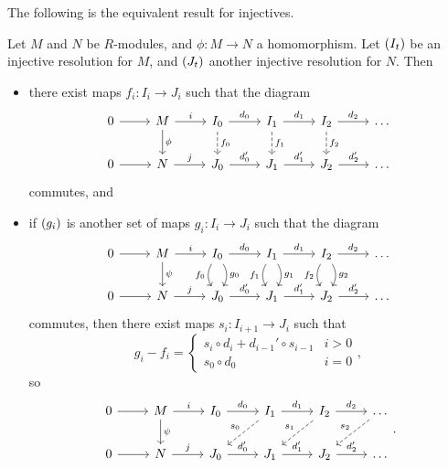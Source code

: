 The following is the equivalent result for injectives.

\begin{proposition}
Let $ M $ and $ N $ be $ R $-modules, and $ \phi : M \to N $ a homomorphism. Let $ \br{I_t} $ be an injective resolution for $ M $, and $ \br{J_t} $ another injective resolution for $ N $. Then
\begin{itemize}
\item there exist maps $ f_i : I_i \to J_i $ such that the diagram
$$
\begin{tikzcd}
0 \arrow{r} & M \arrow{r}{i} \arrow{d}{\phi} & I_0 \arrow{r}{d_0} \arrow[dashed]{d}{f_0} & I_1 \arrow{r}{d_1} \arrow[dashed]{d}{f_1} & I_2 \arrow{r}{d_2} \arrow[dashed]{d}{f_2} & \dots \\
0 \arrow{r} & N \arrow{r}{j} & J_0 \arrow{r}{d_0'} & J_1 \arrow{r}{d_1'} & J_2 \arrow{r}{d_2'} & \dots
\end{tikzcd}
$$
commutes, and
\item if $ \br{g_i} $ is another set of maps $ g_i : I_i \to J_i $ such that the diagram
$$
\begin{tikzcd}
0 \arrow{r} & M \arrow{r}{i} \arrow{d}{\psi} & I_0 \arrow{r}{d_0} \arrow[bend right=30, swap]{d}{f_0} \arrow[bend left=30]{d}{g_0} & I_1 \arrow{r}{d_1} \arrow[bend right=30, swap]{d}{f_1} \arrow[bend left=30]{d}{g_1} & I_2 \arrow{r}{d_2} \arrow[bend right=30, swap]{d}{f_2} \arrow[bend left=30]{d}{g_2} & \dots \\
0 \arrow{r} & N \arrow{r}{j} & J_0 \arrow{r}{d_0'} & J_1 \arrow{r}{d_1'} & J_2 \arrow{r}{d_2'} & \dots
\end{tikzcd}
$$
commutes, then there exist maps $ s_i : I_{i + 1} \to J_i $ such that
$$ g_i - f_i =
\begin{cases}
s_i \circ d_i + d_{i - 1}' \circ s_{i - 1} & i > 0 \\
s_0 \circ d_0 & i = 0
\end{cases},
$$
so
$$
\begin{tikzcd}
0 \arrow{r} & M \arrow{r}{i} \arrow{d}{\psi} & I_0 \arrow{r}{d_0} & I_1 \arrow{r}{d_1} \arrow[dashed, swap]{dl}{s_0} & I_2 \arrow{r}{d_2} \arrow[dashed, swap]{dl}{s_1} & \dots \arrow[dashed, swap]{dl}{s_2} \\
0 \arrow{r} & N \arrow{r}{j} & J_0 \arrow{r}{d_0'} & J_1 \arrow{r}{d_1'} & J_2 \arrow{r}{d_2'} & \dots
\end{tikzcd}.
$$
\end{itemize}
\end{proposition}

